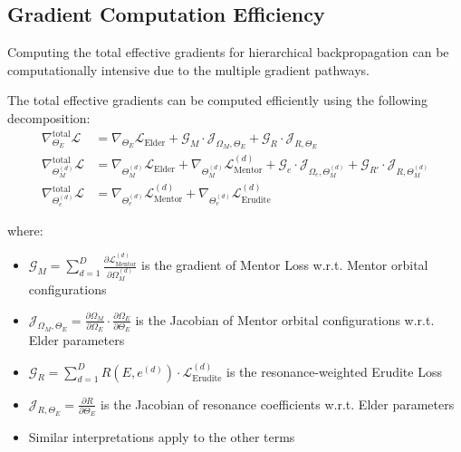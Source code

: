 \subsection{Gradient Computation Efficiency}

Computing the total effective gradients for hierarchical backpropagation can be computationally intensive due to the multiple gradient pathways.

\begin{theorem}
The total effective gradients can be computed efficiently using the following decomposition:
\begin{align}
\nabla_{\Theta_E}^{\text{total}} \mathcal{L} &= \nabla_{\Theta_E} \mathcal{L}_{\text{Elder}} + \mathcal{G}_M \cdot \mathcal{J}_{\Omega_M, \Theta_E} + \mathcal{G}_R \cdot \mathcal{J}_{R, \Theta_E} \\
\nabla_{\Theta_M^{(d)}}^{\text{total}} \mathcal{L} &= \nabla_{\Theta_M^{(d)}} \mathcal{L}_{\text{Elder}} + \nabla_{\Theta_M^{(d)}} \mathcal{L}_{\text{Mentor}}^{(d)} + \mathcal{G}_e \cdot \mathcal{J}_{\Omega_e, \Theta_M^{(d)}} + \mathcal{G}_{R'} \cdot \mathcal{J}_{R, \Theta_M^{(d)}} \\
\nabla_{\Theta_e^{(d)}}^{\text{total}} \mathcal{L} &= \nabla_{\Theta_e^{(d)}} \mathcal{L}_{\text{Mentor}}^{(d)} + \nabla_{\Theta_e^{(d)}} \mathcal{L}_{\text{Erudite}}^{(d)}
\end{align}

where:
\begin{itemize}
    \item $\mathcal{G}_M = \sum_{d=1}^D \frac{\partial \mathcal{L}_{\text{Mentor}}^{(d)}}{\partial \Omega_M^{(d)}}$ is the gradient of Mentor Loss w.r.t. Mentor orbital configurations
    \item $\mathcal{J}_{\Omega_M, \Theta_E} = \frac{\partial \Omega_M}{\partial \Omega_E} \cdot \frac{\partial \Omega_E}{\partial \Theta_E}$ is the Jacobian of Mentor orbital configurations w.r.t. Elder parameters
    \item $\mathcal{G}_R = \sum_{d=1}^D R(E, e^{(d)}) \cdot \mathcal{L}_{\text{Erudite}}^{(d)}$ is the resonance-weighted Erudite Loss
    \item $\mathcal{J}_{R, \Theta_E} = \frac{\partial R}{\partial \Theta_E}$ is the Jacobian of resonance coefficients w.r.t. Elder parameters
    \item Similar interpretations apply to the other terms
\end{itemize}
\end{theorem}

